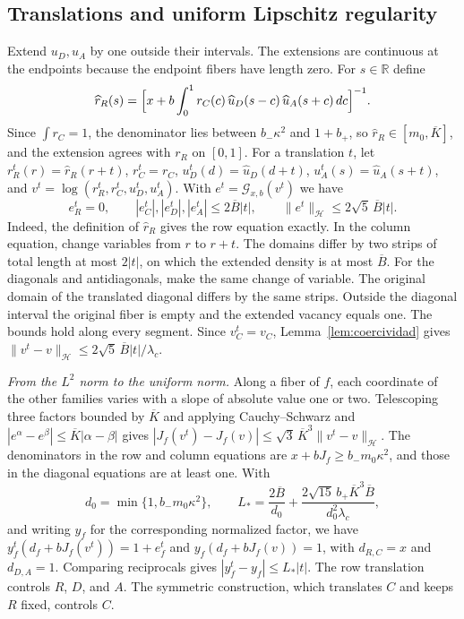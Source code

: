 \subsection{Translations and uniform Lipschitz regularity}

Extend $u_D,u_A$ by one outside their intervals. The extensions are continuous at the endpoints because the
endpoint fibers have length
zero. For $s\in\mathbb R$ define \[
 \widehat r_R(s)=\Bigl[x+b\int_0^1r_C(c)\,\widehat u_D(s-c)\,\widehat u_A(s+c)\,dc\Bigr]^{-1}.
\] Since $\int r_C=1$, the denominator lies between $b_-\kappa^2$ and $1+b_+$, so
$\widehat r_R\in[m_0,\overline K]$, and the extension
agrees with $r_R$ on $[0,1]$. For a translation $t$, let $r_R^t(r)=\widehat r_R(r+t)$, $r_C^t=r_C$,
$u_D^t(d)=\widehat u_D(d+t)$,
$u_A^t(s)=\widehat u_A(s+t)$, and $v^t=\log(r_R^t,r_C^t,u_D^t,u_A^t)$. With $e^t=\mathcal G_{x,b}(v^t)$ we
have \[
 e_R^t=0,\qquad |e_C^t|,|e_D^t|,|e_A^t|\le2\overline B|t|,\qquad
 \|e^t\|_{\mathcal H}\le2\sqrt5\,\overline B|t| .
\] Indeed, the definition of $\widehat r_R$ gives the row equation exactly. In the column equation, change
variables from $r$ to $r+t$.
The domains differ by two strips of total length at most $2|t|$, on which the extended density is at most
$\overline B$. For the
diagonals and antidiagonals, make the same change of variable. The original domain of the translated
diagonal differs by the same
strips. Outside the diagonal interval the original fiber is empty and the extended vacancy equals one. The
bounds hold along every
segment. Since $v_C^t=v_C$, Lemma~\ref{lem:coercividad} gives
$\|v^t-v\|_{\mathcal H}\le2\sqrt5\,\overline B|t|/\lambda_c$.

\emph{From the $L^2$ norm to the uniform norm.} Along a fiber of $f$, each coordinate of the other families
varies with a slope of
absolute value one or two. Telescoping three factors bounded by $\overline K$ and applying Cauchy--Schwarz
and
$|e^\alpha-e^\beta|\le\overline K|\alpha-\beta|$ gives
$|J_f(v^t)-J_f(v)|\le\sqrt3\,\overline K^3\|v^t-v\|_{\mathcal H}$. The
denominators in the row and column equations are $x+bJ_f\ge b_-m_0\kappa^2$, and those in the diagonal
equations are at least one. With
\[
 d_0=\min\{1,b_-m_0\kappa^2\},\qquad
 L_*=\frac{2\overline B}{d_0}+\frac{2\sqrt{15}\,b_+\overline K^3\overline B}{d_0^2\lambda_c},
\] and writing $y_f$ for the corresponding normalized factor, we have $y_f^t(d_f+bJ_f(v^t))=1+e_f^t$ and
$y_f(d_f+bJ_f(v))=1$, with
$d_{R,C}=x$ and $d_{D,A}=1$. Comparing reciprocals gives $|y_f^t-y_f|\le L_*|t|$. The row translation
controls $R$, $D$, and $A$. The
symmetric construction, which translates $C$ and keeps $R$ fixed, controls $C$.

